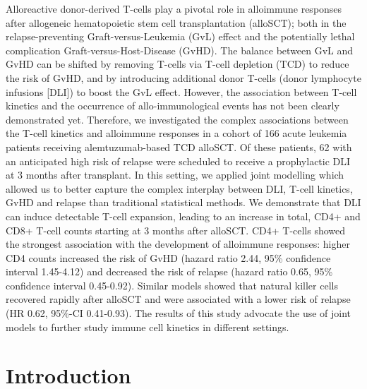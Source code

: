 \documentclass[
  letterpaper,
  DIV=11,
  numbers=noendperiod]{scrreprt}
\begin{document}
Alloreactive donor-derived T-cells play a pivotal role in alloimmune
responses after allogeneic hematopoietic stem cell transplantation
(alloSCT); both in the relapse-preventing Graft-versus-Leukemia (GvL)
effect and the potentially lethal complication Graft-versus-Host-Disease
(GvHD). The balance between GvL and GvHD can be shifted by removing
T-cells via T-cell depletion (TCD) to reduce the risk of GvHD, and by
introducing additional donor T-cells (donor lymphocyte infusions
{[}DLI{]}) to boost the GvL effect. However, the association between
T-cell kinetics and the occurrence of allo-immunological events has not
been clearly demonstrated yet. Therefore, we investigated the complex
associations between the T-cell kinetics and alloimmune responses in a
cohort of 166 acute leukemia patients receiving alemtuzumab-based TCD
alloSCT. Of these patients, 62 with an anticipated high risk of relapse
were scheduled to receive a prophylactic DLI at 3 months after
transplant. In this setting, we applied joint modelling which allowed us
to better capture the complex interplay between DLI, T-cell kinetics,
GvHD and relapse than traditional statistical methods. We demonstrate
that DLI can induce detectable T-cell expansion, leading to an increase
in total, CD4+ and CD8+ T-cell counts starting at 3 months after
alloSCT. CD4+ T-cells showed the strongest association with the
development of alloimmune responses: higher CD4 counts increased the
risk of GvHD (hazard ratio 2.44, 95\% confidence interval 1.45-4.12) and
decreased the risk of relapse (hazard ratio 0.65, 95\% confidence
interval 0.45-0.92). Similar models showed that natural killer cells
recovered rapidly after alloSCT and were associated with a lower risk of
relapse (HR 0.62, 95\%-CI 0.41-0.93). The results of this study advocate
the use of joint models to further study immune cell kinetics in
different settings.

\hfill\break

\hypertarget{introduction-4}{%
\section{Introduction}\label{introduction-4}}
\end{document}

